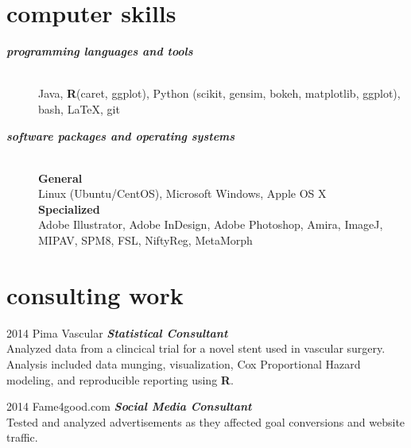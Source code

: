 \documentclass[]{friggeri-cv} %
\begin{document}
\section{computer skills}
\begin{description}
   \item[\textbf{\textit{programming languages and tools}}] \hfill \\  
	 Java, \textbf{R}(caret, ggplot), Python (scikit, gensim, bokeh, matplotlib, ggplot), bash, \LaTeX, git
   \item[\textbf{\textit{software packages and operating systems}}] \hfill \\
	    \textbf{General} \\
		Linux (Ubuntu/CentOS), Microsoft Windows, Apple OS X \\
	    \textbf{Specialized} \\
	    Adobe Illustrator, Adobe InDesign, Adobe Photoshop, Amira, ImageJ, MIPAV, SPM8, FSL, NiftyReg, MetaMorph 
\end{description}



\section{consulting work}
\begin{entrylist}
\entry
{\footnotesize{2014}}
{Pima Vascular}
{}
{\textbf{\emph{Statistical Consultant}} \\
Analyzed data from a clincical trial for a novel stent used in vascular surgery. 
Analysis included data munging, visualization, Cox Proportional Hazard modeling, 
and reproducible reporting using \textbf{R}.}
\end {entrylist}

\begin{entrylist}
\entry
{\footnotesize{2014}}
{Fame4good.com}
{}
{\textbf{\emph{Social Media Consultant}} \\
Tested and analyzed advertisements as they affected goal conversions and website traffic.}
\end {entrylist}
\end{document}
